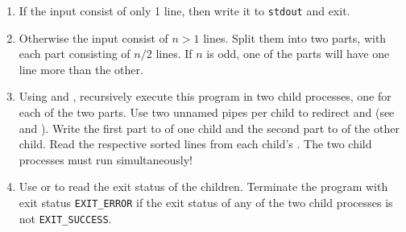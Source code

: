 \begin{enumerate}
\item If the input consist of only 1 line,
then write it to \texttt{stdout} and exit.
\item Otherwise the input consist of $n>1$ lines.
Split them into two parts, with each part consisting of $n/2$ lines.
If $n$ is odd, one of the parts will have one line more than the other.
\item Using  and ,
recursively execute this program in two child processes,
one for each of the two parts.
Use two unnamed pipes per child
to redirect  and 
(see  and ).
Write the first part to  of one child
and the second part to  of the other child.
Read the respective sorted lines from each child's .
The two child processes must run simultaneously!

\item Use  or 
to read the exit status of the children.
Terminate the program with exit status \verb|EXIT_ERROR|
if the exit status of any of the two child processes is not \verb|EXIT_SUCCESS|.


\end{enumerate}
